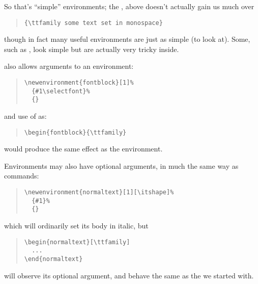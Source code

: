 So that's ``simple'' environments; the , above
doesn't actually gain us much over
\begin{quote}
\begin{verbatim}
{\ttfamily some text set in monospace}
\end{verbatim}
\end{quote}
though in fact many useful environments are just as simple (to look
at).  Some, such as , look simple but are
actually very tricky inside.

\latex{} also allows arguments to an environment:
\begin{quote}
\begin{verbatim}
\newenvironment{fontblock}[1]%
  {#1\selectfont}%
  {}
\end{verbatim}
\end{quote}
and use of  as:
\begin{quote}
\begin{verbatim}
\begin{fontblock}{\ttfamily}
\end{verbatim}
\end{quote}
would produce the same effect as the 
environment.

Environments may also have optional arguments, in much the same way as
commands:
\begin{quote}
\begin{verbatim}
\newenvironment{normaltext}[1][\itshape]%
  {#1}%
  {}
\end{verbatim}
\end{quote}
which will ordinarily set its body in italic, but
\begin{quote}
\begin{verbatim}
\begin{normaltext}[\ttfamily]
  ...
\end{normaltext}
\end{verbatim}
\end{quote}
will observe its optional argument, and behave the same as the
 we started with.


